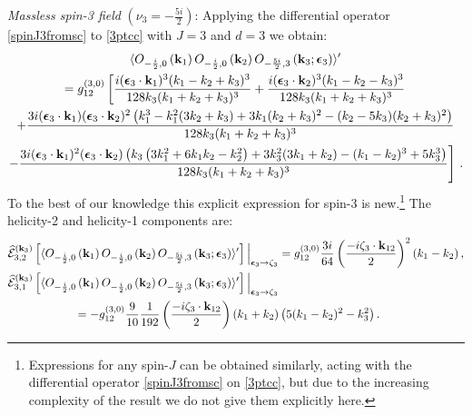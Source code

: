 \documentclass[11pt,a4paper]{article}
\begin{document}
\emph{Massless spin-3 field} $(\nu_3=-\frac{5i}{2})$:
Applying the differential operator \eqref{spinJ3fromsc} to \eqref{3ptcc} with $J=3$ and $d=3$ we obtain:
\begin{multline}
    \langle O_{-\frac{i}{2},0}\left({\bf k}_1\right)O_{-\frac{i}{2},0}\left({\bf k}_2\right)O_{-\frac{5i}{2},3}\left({\bf k}_3;\boldsymbol{\epsilon}_3\right)  \rangle^\prime\\=g^{\left(3,0\right)}_{12}\left[\frac{i (\boldsymbol{\epsilon}_3\cdot{\bf k}_1)^3 (k_1-k_2+k_3)^3}{128 k_3 (k_1+k_2+k_3)^3}+\frac{i (\boldsymbol{\epsilon}_3\cdot{\bf k}_2)^3 (k_1-k_2-k_3)^3}{128 k_3 (k_1+k_2+k_3)^3}\right.\\\nonumber
    +\frac{3 i (\boldsymbol{\epsilon}_3\cdot  {\bf k}_1) (\boldsymbol{\epsilon}_3\cdot{\bf k}_2)^2 \left(k_1^3-k_1^2 (3 k_2+k_3)+3 k_1 (k_2+k_3)^2-(k_2-5 k_3) (k_2+k_3)^2\right)}{128 k_3 (k_1+k_2+k_3)^3}\\\left.-\frac{3 i (\boldsymbol{\epsilon}_3\cdot{\bf k}_1)^2 (\boldsymbol{\epsilon}_3\cdot{\bf k}_2) \left(k_3 \left(3 k_1^2+6 k_1 k_2-k_2^2\right)+3 k_3^2 (3 k_1+k_2)-(k_1-k_2)^3+5 k_3^3\right)}{128 k_3 (k_1+k_2+k_3)^3}\right]\nonumber\,.
\end{multline}
To the best of our knowledge this explicit expression for spin-$3$ is new.\footnote{Expressions for any spin-$J$ can be obtained similarly, acting with the differential operator \eqref{spinJ3fromsc} on \eqref{3ptcc}, but due to the increasing complexity of the result we do not give them explicitly here.} The helicity-2 and helicity-1 components are:
\begin{subequations}
\begin{align}
&  \widehat{\mathcal{E}}^{({\bf k}_3)}_{3,2}\left[\langle O_{-\frac{i}{2},0}\left({\bf k}_1\right)O_{-\frac{i}{2},0}\left({\bf k}_2\right)O_{-\frac{5i}{2},3}\left({\bf k}_3;\boldsymbol{\epsilon}_3\right)  \rangle^\prime\right]\Big|_{\boldsymbol{\epsilon}_3 \to \zeta_3}=  g^{\left(3,0\right)}_{12}\frac{3i}{64} \left(\frac{-i \zeta_3 \cdot {\bf k}_{12} }{2}\right)^2 \left(k_1-k_2\right),\\ \nonumber
 & \widehat{\mathcal{E}}^{({\bf k}_3)}_{3,1}\left[\langle O_{-\frac{i}{2},0}\left({\bf k}_1\right)O_{-\frac{i}{2},0}\left({\bf k}_2\right)O_{-\frac{5i}{2},3}\left({\bf k}_3;\boldsymbol{\epsilon}_3\right)  \rangle^\prime\right]\Big|_{\boldsymbol{\epsilon}_3 \to \zeta_3} \\ & \hspace*{2cm} = - g^{\left(3,0\right)}_{12} \frac{9}{10} \frac{1}{192} \left(\frac{-i \zeta_3 \cdot {\bf k}_{12} }{2}\right)  \left(k_1+k_2\right) \left(5 (k_1-k_2)^2-k^2_3\right).
\end{align}
\end{subequations}
\end{document}

